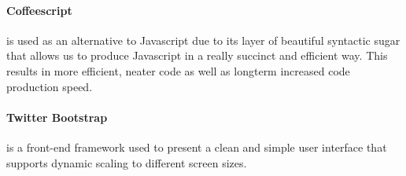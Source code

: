 		\paragraph{Coffeescript\cite{coffeescript}} is used as an alternative to Javascript due to its layer of beautiful syntactic sugar that allows us to produce Javascript in a really succinct and efficient way. This results in more efficient, neater code as well as longterm increased code production speed.
		\paragraph{Twitter Bootstrap\cite{bootstrap}} is a front-end framework used to present a clean and simple user interface that supports dynamic scaling to different screen sizes.